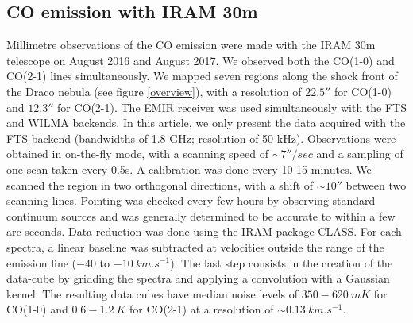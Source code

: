 \documentclass[traditabstract]{aa}
\begin{document}
\subsection{CO emission with IRAM 30m}
Millimetre observations of the CO emission were made with the IRAM 30m telescope on August 2016 and August 2017. 
We observed both the CO(1-0) and CO(2-1) lines simultaneously. We mapped seven regions along the shock front of the Draco nebula 
(see figure \ref{overview}), with a resolution of $22.5''$ for CO(1-0) and $12.3''$ for CO(2-1). The EMIR receiver was used 
simultaneously with the FTS and WILMA backends. In this article, we only present the data acquired with the FTS backend 
(bandwidths of 1.8 GHz; resolution of 50 kHz).
Observations were obtained in on-the-fly mode, with a scanning speed of $\sim 7''/sec$ and a sampling of one scan taken every 0.5s. 
A calibration was done every 10-15 minutes. We scanned the region in two orthogonal directions, with a shift of $\sim 10''$ 
between two scanning lines. Pointing was checked every few hours by observing standard continuum sources and was generally 
determined to be accurate to within a few arc-seconds.
Data reduction was done using the IRAM package CLASS. For each spectra, a linear baseline was subtracted at velocities outside 
the range of the emission line ($-40$ to $-10\: km.s^{-1}$). The last step consists in the creation of the data-cube by 
gridding the spectra and applying a convolution with a Gaussian kernel. The resulting data cubes have median noise levels of 
$350-620\: mK$ for CO(1-0) and $0.6-1.2\: K$ for CO(2-1) at a resolution of $\sim 0.13\: km.s^{-1}$.

\end{document}
